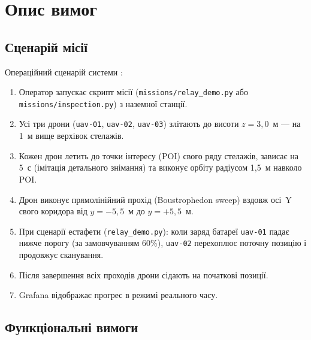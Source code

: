\section{Опис вимог}

\subsection{Сценарій місії}

Операційний сценарій системи \projname{}:

\begin{enumerate}[itemsep=3pt]
  \item Оператор запускає скрипт місії (\texttt{missions/relay\_demo.py} або \texttt{missions/inspection.py}) з наземної станції.
  \item Усі три дрони (\texttt{uav-01}, \texttt{uav-02}, \texttt{uav-03}) злітають до висоти $z=3{,}0$~м — на 1~м вище верхівок стелажів.
  \item Кожен дрон летить до точки інтересу (POI) свого ряду стелажів, зависає на 5~с (імітація детального знімання) та виконує орбіту радіусом 1,5~м навколо POI.
  \item Дрон виконує прямолінійний прохід (Boustrophedon sweep) вздовж осі~Y свого коридора від $y=-5{,}5$~м до $y=+5{,}5$~м.
  \item При сценарії естафети (\texttt{relay\_demo.py}): коли заряд батареї \texttt{uav-01} падає нижче порогу (за замовчуванням 60\%), \texttt{uav-02} перехоплює поточну позицію і продовжує сканування.
  \item Після завершення всіх проходів дрони сідають на початкові позиції.
  \item Grafana відображає прогрес в режимі реального часу.
\end{enumerate}

\subsection{Функціональні вимоги}

